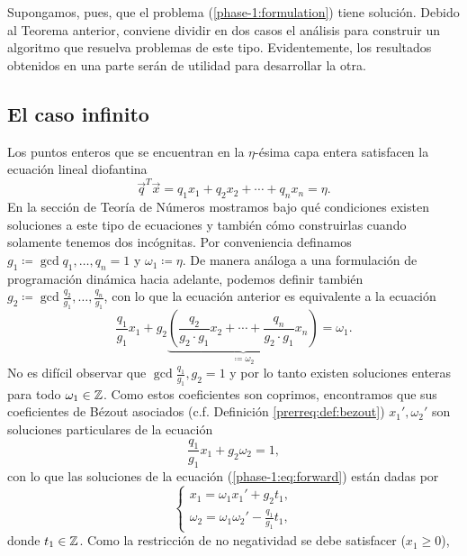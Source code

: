 Supongamos, pues, que el problema (\ref{phase-1:formulation}) tiene solución. Debido al Teorema
anterior, conviene dividir en dos casos el análisis para construir un algoritmo que resuelva
problemas de este tipo. Evidentemente, los resultados obtenidos en una parte serán de utilidad para
desarrollar la otra.

\subsection{El caso infinito}
\noindent
Los puntos enteros que se encuentran en la $\eta$-ésima capa entera satisfacen la ecuación lineal
diofantina
\begin{equation}
	\label{phase-1:eq:dioph}
	\vec{q}^T\vec{x} = q_1x_1 + q_2x_2 + \cdots + q_nx_n = \eta.
\end{equation}
En la sección de Teoría de Números mostramos bajo qué condiciones existen soluciones a este tipo de
ecuaciones y también cómo construirlas cuando solamente tenemos dos incógnitas. Por conveniencia
definamos $g_1 \coloneq \gcd{q_1, \ldots, q_n} = 1$ y $\omega_1 \coloneq \eta$. De manera análoga a
una formulación de programación dinámica hacia adelante, podemos definir también
$g_2 \coloneq \gcd{\frac{q_2}{g_1}, \ldots, \frac{q_n}{g_1}}$, con lo que la ecuación anterior es
equivalente a la ecuación
\begin{equation}
	\label{phase-1:eq:forward}
	\frac{q_1}{g_1}x_1 + g_2
		\underbrace{
		\left(\frac{q_2}{g_2 \cdot g_1}x_2 + \cdots + \frac{q_n}{g_2 \cdot g_1}x_n\right)}_{\coloneq
		\omega_2}
	= \omega_1.
\end{equation}
No es difícil observar que $\gcd{\frac{q_1}{g_1}, g_2} = 1$ y por lo tanto existen soluciones
enteras para todo $\omega_1 \in \mathbb{Z}$. Como estos coeficientes son coprimos, encontramos que sus
coeficientes de Bézout asociados (c.f. Definición \ref{prerreq:def:bezout}) $x_1', \omega_2'$ son
soluciones particulares de la ecuación
\begin{equation*}
	\frac{q_1}{g_1}x_1 + g_2\omega_2 = 1,
\end{equation*}
con lo que las soluciones de la ecuación (\ref{phase-1:eq:forward}) están dadas por
\begin{equation*}
	\begin{cases}
		x_1 = \omega_1x_1' + g_2t_1, \\
		\omega_2 = \omega_1\omega_2' - \frac{q_1}{g_1}t_1,
	\end{cases}
\end{equation*}
donde $t_1 \in \mathbb{Z}$. Como la restricción de no negatividad se debe satisfacer ($x_1 \geq 0$),
